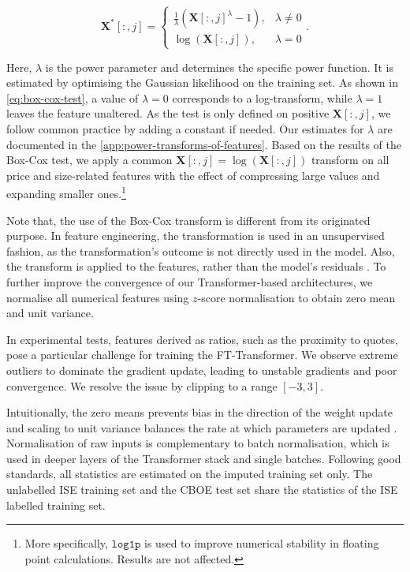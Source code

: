 \begin{equation}
    \mathbf{X}^{*}\left[:,j\right]= \begin{cases}\frac{1}{\lambda}(\mathbf{X}\left[:,j\right]^\lambda-1), & \lambda \neq 0 \\ \log (\mathbf{X}\left[:,j\right]),& \lambda=0\end{cases}.
    \label{eq:box-cox-test}
\end{equation}

Here, $\lambda$ is the power parameter and determines the specific power function. It is estimated by optimising the Gaussian likelihood on the training set. As shown in \cref{eq:box-cox-test}, a value of $\lambda=0$ corresponds to a log-transform, while $\lambda=1$ leaves the feature unaltered. As the test is only defined on positive $\mathbf{X}\left[:,j\right]$, we follow common practice by adding a constant if needed. Our estimates for $\lambda$ are documented in the \cref{app:power-transforms-of-features}. Based on the results of the Box-Cox test, we apply a common $\mathbf{X}\left[:,j\right]=\log(\mathbf{X}\left[:,j\right])$ transform on all price and size-related features with the effect of compressing large values and expanding smaller ones.\footnote{More specifically, $\mathtt{log1p}$ is used to improve numerical stability in floating point calculations. Results are not affected.}

Note that, the use of the Box-Cox transform is different from its originated purpose. In feature engineering, the transformation is used in an unsupervised fashion, as the transformation's outcome is not directly used in the model. Also, the transform is applied to the features, rather than the model's residuals \autocite[122]{kuhnFeatureEngineeringSelection2020}.
To further improve the convergence of our Transformer-based architectures, we normalise all numerical features using $z$-score normalisation to obtain zero mean and unit variance.

In experimental tests, features derived as ratios, such as the proximity to quotes, pose a particular challenge for training the FT-Transformer. We observe extreme outliers to dominate the gradient update, leading to unstable gradients and poor convergence. We resolve the issue by clipping to a range $[-3,3]$.

Intuitionally, the zero means prevents bias in the direction of the weight update and scaling to unit variance balances the rate at which parameters are updated \autocite[][8]{lecunEfficientBackProp2012}. Normalisation of raw inputs is complementary to batch normalisation, which is used in deeper layers of the Transformer stack and single batches. Following good standards, all statistics are estimated on the imputed training set only. The unlabelled \gls{ISE} training set and the \gls{CBOE} test set share the statistics of the \gls{ISE} labelled training set.

